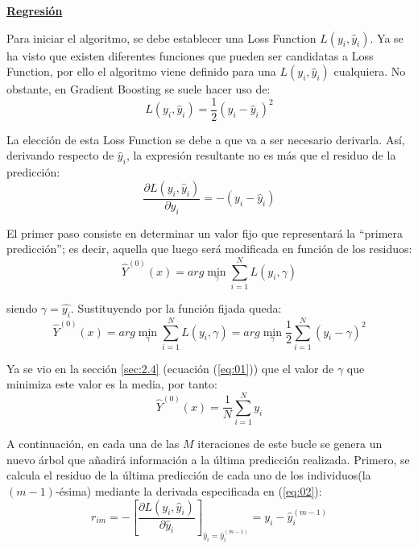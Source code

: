 \documentclass[12pt,twoside]{article}
\begin{document}
\bigskip \bigskip 

\textbf{\underline{Regresión}}


Para iniciar el algoritmo, se debe establecer una Loss Function $L(y_i, \hat{y}_i)$. Ya se ha visto que existen diferentes funciones que pueden ser candidatas a Loss Function, por ello el algoritmo viene definido para una $L(y_i, \hat{y}_i)$ cualquiera. No obstante, en Gradient Boosting se suele hacer uso de:
\begin{equation*}
L(y_i, \hat{y}_i) = \frac{1}{2}(y_i - \hat{y}_i)^2
\end{equation*}

La elección de esta Loss Function se debe a que va a ser necesario derivarla. Así, derivando respecto de $\hat{y}_i$, la expresión resultante no es más que el residuo de la predicción:
\begin{equation}
\label{eq:02}
\frac{\partial L(y_i, \hat{y}_i)}{\partial \hat{y}_i} = -(y_i - \hat{y}_i)
\end{equation}

El primer paso consiste en determinar un valor fijo que representará la ``primera predicción''; es decir, aquella que luego será modificada en función de los residuos:
\begin{equation*}
\hat{Y}^{(0)}(x) = arg\min_{\gamma} \sum_{i=1}^N L(y_i, \gamma)
\end{equation*}

\noindent
siendo $\gamma = \hat{y_i}$. Sustituyendo por la función fijada queda:
\begin{equation*}
\hat{Y}^{(0)}(x) = arg\min_{\gamma} \sum_{i=1}^N L(y_i, \gamma) = arg\min_{\gamma} \frac{1}{2}\sum_{i=1}^N (y_i - \gamma)^2 
\end{equation*}

Ya se vio en la sección \ref{sec:2.4} (ecuación (\ref{eq:01})) que el valor de $\gamma$ que minimiza este valor es la media, por tanto:
\begin{equation*}
\hat{Y}^{(0)}(x) = \frac{1}{N} \sum_{i=1}^N y_i
\end{equation*}

A continuación, en cada una de las $M$ iteraciones de este bucle se genera un nuevo árbol que añadirá información a la última predicción realizada. Primero, se calcula el residuo de la última predicción de cada uno de los individuos(la $(m-1)$-ésima) mediante la derivada especificada en (\ref{eq:02}):
\begin{equation*}
r_{im} = - \left[ \frac{\partial L(y_i, \hat{y}_i)}{\partial \hat{y}_i} \right]_{\hat{y}_i = \hat{y}_i^{(m-1)}} = y_i -\hat{y}_i^{(m-1)}
\end{equation*}
\end{document}
